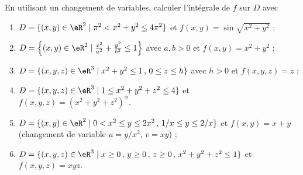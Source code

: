 \begin{exercice}\label{exoIntegralesMultiples0011}

En utilisant un changement de variables, calculer l'intégrale de $f$ sur $D$ avec
\begin{enumerate}
\item $D=\{ (x,y)\in \eR^2 \mid \pi^2 < x^2+y^2 \leq 4\pi^2 \}$ et $f(x,y)=\sin \sqrt{x^2+y^2}$ ;
\item $D=\left\{ (x,y)\in \eR^2 \mid \frac{x^2}{a^2}+\frac{y^2}{b^2} \leq 1 \right\}$ avec $a,b>0$ et $f(x,y)=x^2+y^2$ ;
\item $D=\{ (x,y,z)\in \eR^3 \mid x^2+y^2 \leq 1\, ,\, 0\leq z\leq h \}$ avec $h>0$ et $f(x,y,z)=z$ ;
\item $D=\{ (x,y,z)\in \eR^3 \mid 1\leq x^2+y^2+z^2 \leq 4 \}$ et $f(x,y,z)=(x^2+y^2+z^2)^\alpha $.
\item $D=\{ (x,y)\in \eR^2 \mid 0 < x^2\leq y\leq 2x^2\, ,\, 1/x\leq y \leq 2/x \}$ et $f(x,y)=x+y$ (changement de variable $u=y/x^2$, $v=xy$) ;
\item $D=\{ (x,y,z)\in \eR^3 \mid x\geq 0\, ,\, y\geq 0\, ,\, z\geq 0\, ,\, x^2+y^2+z^2 \leq 1 \}$ et $f(x,y,z)=xyz$.
\end{enumerate}


\end{exercice}
